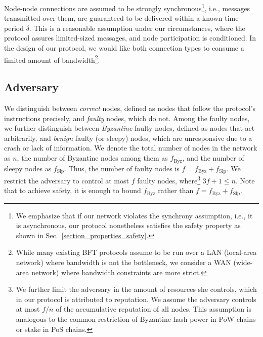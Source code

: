 Node-node connections are assumed to be strongly synchronous\footnote{We emphasize that if our network violates the synchrony assumption, i.e., it is asynchronous, our protocol nonetheless satisfies the safety property as shown in Sec.~\ref{section_properties_safety}.}, i.e., messages transmitted over them, are guaranteed to be delivered within a known time period $\delta$. This is a reasonable assumption under our circumstances, where the protocol assures limited-sized messages, and node participation is conditioned.
In the design of our protocol, we would like both connection types to consume a limited amount of bandwidth\footnote{While many existing BFT protocols assume to be run over a LAN (local-area network) where bandwidth is not the bottleneck, we consider a WAN (wide-area network) where bandwidth constraints are more strict.}.

\subsection{Adversary}
We distinguish between \emph{correct} nodes, defined as nodes that follow the protocol’s instructions precisely, and \emph{faulty} nodes, which do not. Among the faulty nodes, we further distinguish between \emph{Byzantine} faulty nodes, defined as nodes that act arbitrarily, and \emph{benign} faulty (or sleepy) nodes, which are unresponsive due to a crash or lack of information. We denote the total number of nodes in the network as $n$, the number of Byzantine nodes among them as $f_\text{Byz}$, and the number of sleepy nodes as $f_\text{Slp}$. Thus, the number of faulty nodes is $f=f_\text{Byz}+f_\text{Slp}$. 
We restrict the adversary to control at most $f$ faulty nodes, where\footnote{We further limit the adversary in the amount of resources she controls, which in our protocol is attributed to reputation. We assume the adversary controls at most $f / n$ of the accumulative reputation of all nodes. This assumption is analogous to the common restriction of Byzantine hash power in PoW chains or stake in PoS chains.} $3f+1 \leq n$.
Note that to achieve safety, it is enough to bound $f_\text{Byz}$ rather than $f=f_\text{Byz}+f_\text{Slp}$. 

